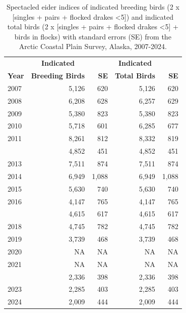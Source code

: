 \documentclass[
]{article}
\begin{document}
\begin{longtable}[t]{lrrrr}

\caption{\label{tbl-SPEI}Spectacled eider indices of indicated breeding
birds (2 x {[}singles + pairs + flocked drakes \textless5{]}) and
indicated total birds (2 x {[}singles + pairs + flocked drakes
\textless5{]} + birds in flocks) with standard errors (SE) from the
Arctic Coastal Plain Survey, Alaska, 2007-2024.}

\tabularnewline

\\
\toprule
\multicolumn{1}{c}{\textbf{ }} & \multicolumn{1}{c}{\textbf{Indicated}} & \multicolumn{1}{c}{\textbf{ }} & \multicolumn{1}{c}{\textbf{Indicated}} & \multicolumn{1}{c}{\textbf{ }} \\
\cmidrule(l{3pt}r{3pt}){2-2} \cmidrule(l{3pt}r{3pt}){4-4}
\textbf{Year} & \textbf{Breeding Birds} & \textbf{SE} & \textbf{Total Birds} & \textbf{SE}\\
\midrule
2007 & 5,126 & 620 & 5,126 & 620\\
2008 & 6,208 & 628 & 6,257 & 629\\
2009 & 5,380 & 823 & 5,380 & 823\\
2010 & 5,718 & 601 & 6,285 & 677\\
2011 & 8,261 & 812 & 8,332 & 819\\
\addlinespace
2012 & 4,852 & 451 & 4,852 & 451\\
2013 & 7,511 & 874 & 7,511 & 874\\
2014 & 6,949 & 1,088 & 6,949 & 1,088\\
2015 & 5,630 & 740 & 5,630 & 740\\
2016 & 4,147 & 765 & 4,147 & 765\\
\addlinespace
2017 & 4,615 & 617 & 4,615 & 617\\
2018 & 4,745 & 782 & 4,745 & 782\\
2019 & 3,739 & 468 & 3,739 & 468\\
2020 & NA & NA & NA & NA\\
2021 & NA & NA & NA & NA\\
\addlinespace
2022 & 2,336 & 398 & 2,336 & 398\\
2023 & 2,285 & 403 & 2,285 & 403\\
2024 & 2,009 & 444 & 2,009 & 444\\
\bottomrule

\end{longtable}

\endgroup{}

\newpage{}
\end{document}
